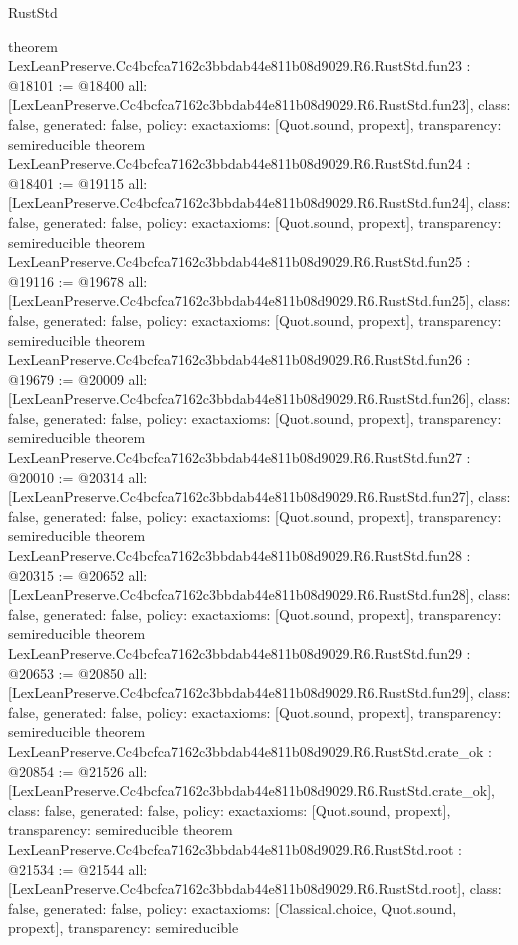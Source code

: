 \begin{lexlean}{RustStd}
\begin{coremodule}
{}
theorem LexLeanPreserve.Cc4bcfca7162c3bbdab44e811b08d9029.R6.RustStd.fun23 : @18101 := @18400 {
  all: [LexLeanPreserve.Cc4bcfca7162c3bbdab44e811b08d9029.R6.RustStd.fun23],
  class: false,
  generated: false,
  policy: exact{axioms: [Quot.sound, propext]},
  transparency: semireducible
}
theorem LexLeanPreserve.Cc4bcfca7162c3bbdab44e811b08d9029.R6.RustStd.fun24 : @18401 := @19115 {
  all: [LexLeanPreserve.Cc4bcfca7162c3bbdab44e811b08d9029.R6.RustStd.fun24],
  class: false,
  generated: false,
  policy: exact{axioms: [Quot.sound, propext]},
  transparency: semireducible
}
theorem LexLeanPreserve.Cc4bcfca7162c3bbdab44e811b08d9029.R6.RustStd.fun25 : @19116 := @19678 {
  all: [LexLeanPreserve.Cc4bcfca7162c3bbdab44e811b08d9029.R6.RustStd.fun25],
  class: false,
  generated: false,
  policy: exact{axioms: [Quot.sound, propext]},
  transparency: semireducible
}
theorem LexLeanPreserve.Cc4bcfca7162c3bbdab44e811b08d9029.R6.RustStd.fun26 : @19679 := @20009 {
  all: [LexLeanPreserve.Cc4bcfca7162c3bbdab44e811b08d9029.R6.RustStd.fun26],
  class: false,
  generated: false,
  policy: exact{axioms: [Quot.sound, propext]},
  transparency: semireducible
}
theorem LexLeanPreserve.Cc4bcfca7162c3bbdab44e811b08d9029.R6.RustStd.fun27 : @20010 := @20314 {
  all: [LexLeanPreserve.Cc4bcfca7162c3bbdab44e811b08d9029.R6.RustStd.fun27],
  class: false,
  generated: false,
  policy: exact{axioms: [Quot.sound, propext]},
  transparency: semireducible
}
theorem LexLeanPreserve.Cc4bcfca7162c3bbdab44e811b08d9029.R6.RustStd.fun28 : @20315 := @20652 {
  all: [LexLeanPreserve.Cc4bcfca7162c3bbdab44e811b08d9029.R6.RustStd.fun28],
  class: false,
  generated: false,
  policy: exact{axioms: [Quot.sound, propext]},
  transparency: semireducible
}
theorem LexLeanPreserve.Cc4bcfca7162c3bbdab44e811b08d9029.R6.RustStd.fun29 : @20653 := @20850 {
  all: [LexLeanPreserve.Cc4bcfca7162c3bbdab44e811b08d9029.R6.RustStd.fun29],
  class: false,
  generated: false,
  policy: exact{axioms: [Quot.sound, propext]},
  transparency: semireducible
}
theorem LexLeanPreserve.Cc4bcfca7162c3bbdab44e811b08d9029.R6.RustStd.crate_ok : @20854 := @21526 {
  all: [LexLeanPreserve.Cc4bcfca7162c3bbdab44e811b08d9029.R6.RustStd.crate_ok],
  class: false,
  generated: false,
  policy: exact{axioms: [Quot.sound, propext]},
  transparency: semireducible
}
theorem LexLeanPreserve.Cc4bcfca7162c3bbdab44e811b08d9029.R6.RustStd.root : @21534 := @21544 {
  all: [LexLeanPreserve.Cc4bcfca7162c3bbdab44e811b08d9029.R6.RustStd.root],
  class: false,
  generated: false,
  policy: exact{axioms: [Classical.choice, Quot.sound, propext]},
  transparency: semireducible
}


\end{coremodule}
\end{lexlean}
